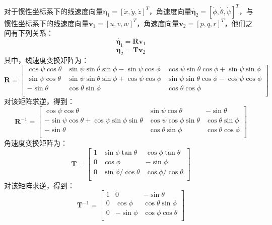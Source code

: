对于惯性坐标系下的线速度向量$\dot{\symbf{\eta}_1}=[\dot{x},\dot{y},\dot{z}]^T$，角速度向量$\dot{\symbf{\eta}_2} = [\dot{\phi},\dot{\theta},\dot{\psi}]^T$，与惯性坐标系下的线速度向量$\symbf{v}_1=[u,v,w]^T$，角速度向量$\symbf{v}_2=[p,q,r]^T$，他们之间有下列关系：
\begin{equation}
\dot{\symbf{\eta}_1}=\symbf{R}\symbf{v}_1
\label{eq.linear_velocity_trans}
\end{equation}
\begin{equation}
\dot{\symbf{\eta}_2}=\symbf{T}\symbf{v}_2
\label{eq.angular_velocity_trans}
\end{equation}
其中，线速度变换矩阵为：
\begin{equation}
    \symbf{R} = \begin{bmatrix}
        \cos \psi \cos \theta & \sin\psi\sin\theta\sin\phi-\sin\psi\cos\phi & \cos\psi\sin\theta\cos\phi+\sin\psi\sin\phi \\
        \sin\psi\cos\theta & \sin\psi\sin\theta\sin\phi+\cos\psi\cos\phi & \sin\psi\sin\theta\cos\phi-\cos\psi\cos\phi \\
        -\sin\theta & \cos\theta\sin\phi & \cos\theta\cos\phi \\
    \end{bmatrix}
    \label{eq.R_trans}
\end{equation}
对该矩阵求逆，得到：
\begin{equation}
    \symbf{R}^{-1} = \begin{bmatrix}
        \cos\psi\cos\theta & \sin\psi\cos\theta & -\sin\theta \\
        -\sin\psi\cos\theta+\cos\psi\sin\phi\sin\theta & \cos\psi\cos\phi\sin\theta & \cos\theta\sin\phi \\
        -\sin\theta & \cos\theta\sin\phi & \cos\theta\cos\phi \\
    \end{bmatrix}
    \label{eq.R_trans_inv}
\end{equation}
角速度变换矩阵为：
\begin{equation}
    \symbf{T} = \begin{bmatrix}
        1 & \sin\phi\tan\theta & \cos\phi\tan\theta \\
        0 & \cos\phi & -\sin\phi \\
        0 & \sin\phi / \cos\theta & \cos\phi / \cos\theta \\
    \end{bmatrix}
    \label{eq.T_trans}
\end{equation}
对该矩阵求逆，得到：
\begin{equation}
    \symbf{T}^{-1} = \begin{bmatrix}
        1 & 0 & -\sin\theta \\
        0 & \cos\phi & \cos\theta\sin\phi \\
        0 & -\sin\phi & \cos\phi\cos\theta \\
    \end{bmatrix}
    \label{eq.T_trans_inv}
\end{equation}
